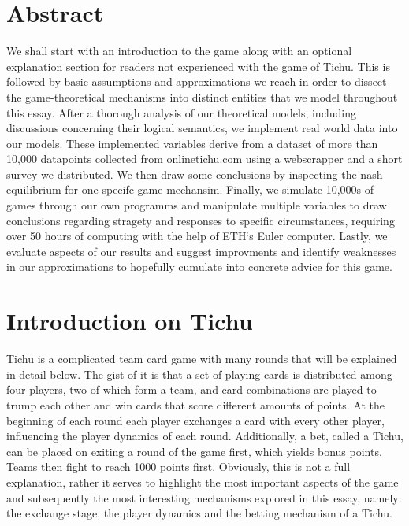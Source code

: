 \section*{Abstract}
We shall start with an introduction to the game along with an optional explanation section for readers not experienced with the game of Tichu. This is followed by basic assumptions and approximations we reach in order to dissect the game-theoretical mechanisms into distinct entities that we model throughout this essay. After a thorough analysis of our theoretical models, including discussions concerning their logical semantics, we implement real world data into our models. These implemented variables derive from a dataset of more than 10,000 datapoints collected from onlinetichu.com using a webscrapper and a short survey we distributed. We then draw some conclusions by inspecting the nash equilibrium for one specifc game mechansim. Finally, we simulate 10,000s of games through our own programms and manipulate multiple variables to draw conclusions regarding stragety and responses to specific circumstances, requiring over 50 hours of computing with the help of ETH‘s Euler computer. Lastly, we evaluate aspects of our results and suggest improvments and identify weaknesses in our approximations to hopefully cumulate into concrete advice for this game.

\section{Introduction on Tichu}

Tichu is a complicated team card game with many rounds that will be explained in detail below. The gist of it is that a set of playing cards is distributed among four players, two of which form a team, and card combinations are played to trump each other and win cards that score different amounts of points. At the beginning of each round each player exchanges a card with every other player, influencing the player dynamics of each round. Additionally, a bet, called a Tichu, can be placed on exiting a round of the game first, which yields bonus points. Teams then fight to reach 1000 points first. Obviously, this is not a full explanation, rather it serves to highlight the most important aspects of the game and subsequently the most interesting mechanisms explored in this essay, namely: the exchange stage, the player dynamics and the betting mechanism of a Tichu. 

